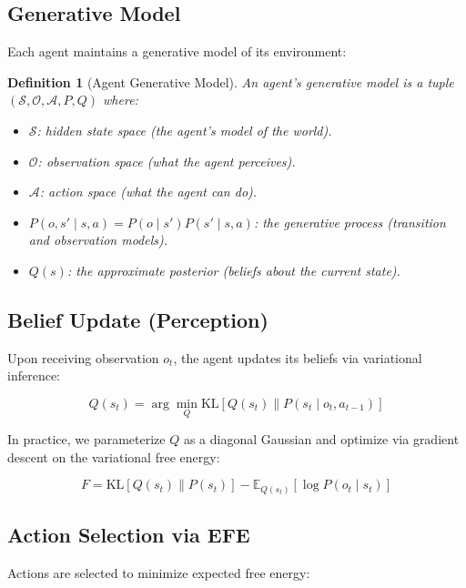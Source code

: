 \documentclass[11pt,letterpaper]{article}
\newtheorem{definition}{Definition}[section]
\newcommand{\E}{\mathbb{E}}
\newcommand{\KL}{\mathrm{KL}}
\begin{document}
\subsection{Generative Model}

Each agent maintains a generative model of its environment:

\begin{definition}[Agent Generative Model]
An agent's generative model is a tuple $(\mathcal{S}, \mathcal{O}, \mathcal{A}, P, Q)$ where:
\begin{itemize}
    \item $\mathcal{S}$: hidden state space (the agent's model of the world).
    \item $\mathcal{O}$: observation space (what the agent perceives).
    \item $\mathcal{A}$: action space (what the agent can do).
    \item $P(o, s' \mid s, a) = P(o \mid s') P(s' \mid s, a)$: the generative process (transition and observation models).
    \item $Q(s)$: the approximate posterior (beliefs about the current state).
\end{itemize}
\end{definition}

\subsection{Belief Update (Perception)}

Upon receiving observation $o_t$, the agent updates its beliefs via variational inference:

\begin{equation}
Q(s_t) = \arg\min_{Q} \KL[Q(s_t) \| P(s_t \mid o_t, a_{t-1})]
\label{eq:belief_update}
\end{equation}

In practice, we parameterize $Q$ as a diagonal Gaussian and optimize via gradient descent on the variational free energy:

\begin{equation}
F = \KL[Q(s_t) \| P(s_t)] - \E_{Q(s_t)}[\log P(o_t \mid s_t)]
\end{equation}

\subsection{Action Selection via EFE}

Actions are selected to minimize expected free energy:
\end{document}
